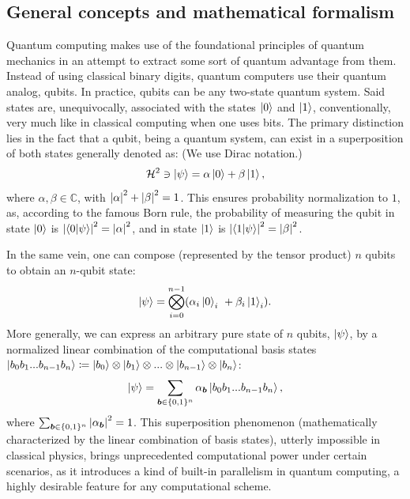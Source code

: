 \subsection*{General concepts and mathematical formalism}

Quantum computing makes use of the foundational principles of quantum mechanics in an attempt to extract some sort of quantum advantage from them. Instead of using classical binary digits, quantum computers use their quantum analog, qubits. In practice, qubits can be any two-state quantum system. Said states are, unequivocally, associated with the states $\ket{0}$ and $\ket{1}$, conventionally, very much like in classical computing when one uses bits. The primary distinction lies in the fact that a qubit, being a quantum system, can exist in a superposition of both states generally denoted as: (We use Dirac notation.)
\begin{equation}
  \mathcal{H}^2 \ni \ket{\psi} = \alpha \ket{0} + \beta \ket{1},
\end{equation}
where $\alpha, \beta \in \mathbb{C}$, with $\abs{\alpha}^2 + \abs{\beta}^2 = 1$. This ensures probability normalization to $1$, as, according to the famous Born rule, the probability of measuring the qubit in state $\ket{0}$ is $\abs{\bra{0}\ket{\psi}}^2 = \abs{\alpha}^2$, and in state $\ket{1}$ is $\abs{\bra{1}\ket{\psi}}^2 = \abs{\beta}^2$.

In the same vein, one can compose (represented by the tensor product) $n$ qubits to obtain an $n$-qubit state:
\begin{equation}\label{eq:n_qubit_state}
  \ket{\psi}=\bigotimes_{i=0}^{n-1}(\alpha_{i}\ket{0}_{i}\ +\beta_{i}\ket{1}_{i}).
\end{equation}
More generally, we can express an arbitrary pure state of $n$ qubits, $\ket{\psi}$, by a normalized linear combination of the computational basis states $\ket{b_0 b_1 ... b_{n-1} b_n} \coloneq \ket{b_0} \otimes \ket{b_1} \otimes ... \otimes \ket{b_{n-1}} \otimes \ket{b_n}$:
\begin{equation}\label{eq:general_n_qubit_state}
  \ket{\psi} = \sum_{\boldsymbol{b} \in \{0, 1\}^{n}} \alpha_{\boldsymbol{b}} \ket{b_0 b_1 ... b_{n-1} b_n},
\end{equation}
where $\sum_{\boldsymbol{b} \in \{0, 1\}^{n}} \abs{\alpha_{\boldsymbol{b}}}^2 = 1$. This superposition phenomenon (mathematically characterized by the linear combination of basis states), utterly impossible in classical physics, brings unprecedented computational power under certain scenarios, as it introduces a kind of built-in parallelism in quantum computing, a highly desirable feature for any computational scheme.

